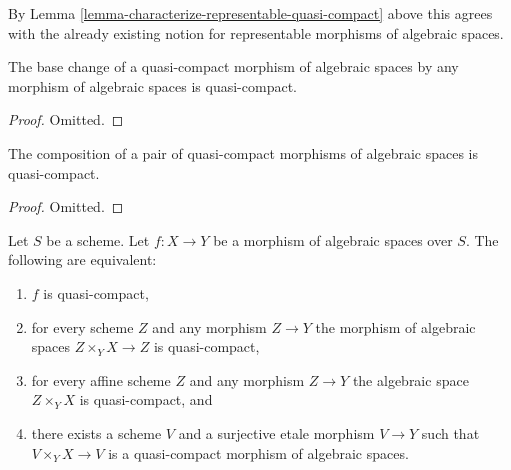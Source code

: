\noindent
By Lemma \ref{lemma-characterize-representable-quasi-compact}
above this agrees with the already existing notion
for representable morphisms of algebraic spaces.

\begin{lemma}
\label{lemma-base-change-quasi-compact}
The base change of a quasi-compact morphism of algebraic spaces
by any morphism of algebraic spaces is quasi-compact.
\end{lemma}

\begin{proof}
Omitted.
\end{proof}

\begin{lemma}
\label{lemma-composition-quasi-compact}
The composition of a pair of quasi-compact morphisms of algebraic spaces
is quasi-compact.
\end{lemma}

\begin{proof}
Omitted.
\end{proof}

\begin{lemma}
\label{lemma-characterize-quasi-compact}
Let $S$ be a scheme.
Let $f : X \to Y$ be a morphism of algebraic spaces over $S$.
The following are equivalent:
\begin{enumerate}
\item $f$ is quasi-compact,
\item for every scheme $Z$ and any morphism $Z \to Y$ the morphism of
algebraic spaces $Z \times_Y X \to Z$ is quasi-compact,
\item for every affine scheme $Z$ and any morphism
$Z \to Y$ the algebraic space $Z \times_Y X$ is quasi-compact, and
\item there exists a scheme $V$ and a surjective etale morphism
$V \to Y$ such that $V \times_Y X \to V$ is a quasi-compact morphism
of algebraic spaces.
\end{enumerate}
\end{lemma}


